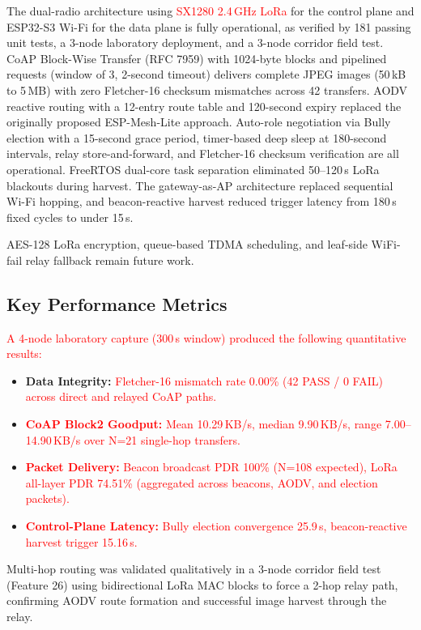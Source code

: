 \documentclass[12pt,a4paper]{article}
\DeclareRobustCommand{\changed}[1]{\textcolor{red}{#1}}
\begin{document}
The dual-radio architecture using \changed{SX1280 2.4\,GHz LoRa} for the control plane and ESP32-S3 Wi-Fi for the data plane is fully operational, as verified by 181 passing unit tests, a 3-node laboratory deployment, and a 3-node corridor field test. CoAP Block-Wise Transfer (RFC 7959) with 1024-byte blocks and pipelined requests (window of 3, 2-second timeout) delivers complete JPEG images (50\,kB to 5\,MB) with zero Fletcher-16 checksum mismatches across 42 transfers. AODV reactive routing with a 12-entry route table and 120-second expiry replaced the originally proposed ESP-Mesh-Lite approach. Auto-role negotiation via Bully election with a 15-second grace period, timer-based deep sleep at 180-second intervals, relay store-and-forward, and Fletcher-16 checksum verification are all operational. FreeRTOS dual-core task separation eliminated 50--120\,s LoRa blackouts during harvest. The gateway-as-AP architecture replaced sequential Wi-Fi hopping, and beacon-reactive harvest reduced trigger latency from 180\,s fixed cycles to under 15\,s.

AES-128 LoRa encryption, queue-based TDMA scheduling, and leaf-side WiFi-fail relay fallback remain future work.

\subsection{Key Performance Metrics}

\changed{A 4-node laboratory capture (300\,s window) produced the following quantitative results:}

\begin{itemize}
    \item \textbf{Data Integrity:} \changed{Fletcher-16 mismatch rate 0.00\% (42 PASS / 0 FAIL) across direct and relayed CoAP paths.}
    \item \changed{\textbf{CoAP Block2 Goodput:} Mean 10.29\,KB/s, median 9.90\,KB/s, range 7.00--14.90\,KB/s over N=21 single-hop transfers.}
    \item \changed{\textbf{Packet Delivery:} Beacon broadcast PDR 100\% (N=108 expected), LoRa all-layer PDR 74.51\% (aggregated across beacons, AODV, and election packets).}
    \item \changed{\textbf{Control-Plane Latency:} Bully election convergence 25.9\,s, beacon-reactive harvest trigger 15.16\,s.}
\end{itemize}

Multi-hop routing was validated qualitatively in a 3-node corridor field test (Feature 26) using bidirectional LoRa MAC blocks to force a 2-hop relay path, confirming AODV route formation and successful image harvest through the relay.
\end{document}
